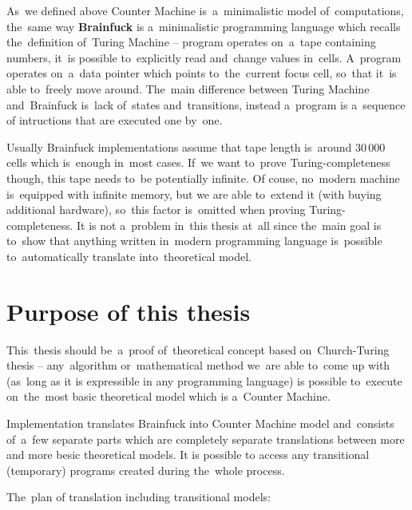 \documentclass[english,shortabstract,mgr]{iithesis}
\begin{document}
As~we defined above Counter Machine is~a~minimalistic model of~computations, the~same way
\textbf{Brainfuck} is a~minimalistic programming language which recalls the~definition
of~Turing Machine -- program operates on~a~tape containing numbers, it~is possible
to~explicitly read and~change values in~cells. A~program operates on~a~data pointer which
points to~the~current focus cell, so~that it~is able to~freely move around. The~main difference
between Turing Machine and~Brainfuck is~lack of~states and~transitions, instead a~program
is a~sequence of intructions that are executed one by~one.

Usually Brainfuck implementations assume that tape length is~around $30\,000$ cells which
is~enough in~most cases. If~we want to~prove Turing-completeness though, this tape
needs to~be potentially infinite. Of couse, no~modern machine is~equipped with infinite memory,
but we are able to~extend it (with buying additional hardware), so~this factor is~omitted
when proving Turing-completeness. It is not a~problem in~this thesis at~all since
the~main goal is to~show that anything written in~modern programming language is~possible
to~automatically translate into~theoretical model.

\section {Purpose of this thesis}

This~thesis should be~a~proof of~theoretical concept based on~Church-Turing thesis -- any~algorithm
or~mathematical method we~are able to~come up with (as~long as it is expressible in any programming
language) is possible to~execute on~the~most basic theoretical model which is a~Counter Machine.

Implementation translates Brainfuck into Counter Machine model and~consists of~a~few separate parts
which are completely separate translations between more and more besic theoretical models.
It is possible to access any transitional (temporary) programs created during the~whole process.

The~plan of translation including transitional models:

\hspace{-1.5cm}
\end{document}
